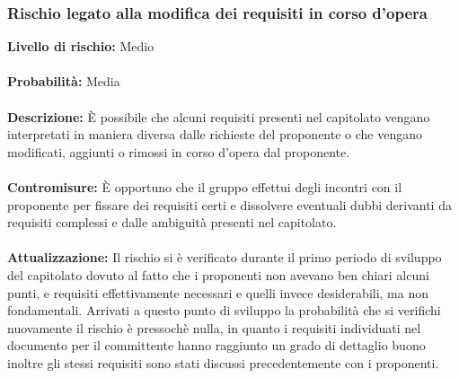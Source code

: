 	\subsubsection{Rischio legato alla modifica dei requisiti in corso d'opera}
	\label{AnalisiDeiRischi_Requisiti}
		\textbf{Livello di rischio:} Medio
		\\ \\
		\textbf{Probabilità:} Media
		\\ \\
		\textbf{Descrizione:} È possibile che alcuni requisiti presenti nel capitolato vengano interpretati in maniera diversa dalle richieste del proponente o che vengano modificati, aggiunti o rimossi in corso d'opera dal proponente.
		\\ \\		
		\textbf{Contromisure:} È opportuno che il gruppo effettui degli incontri con il proponente per fissare dei requisiti certi e dissolvere eventuali dubbi derivanti da requisiti complessi e dalle ambiguità presenti nel capitolato.
		\\ \\
		\textbf{Attualizzazione:} Il rischio si è verificato durante il primo periodo di sviluppo del capitolato dovuto al fatto che i proponenti non avevano ben chiari alcuni punti, e requisiti effettivamente necessari e quelli invece desiderabili, ma non fondamentali. Arrivati a questo punto di sviluppo la probabilità che si verifichi nuovamente il rischio è pressochè nulla, in quanto i requisiti individuati nel documento \analisi{} per il committente hanno raggiunto un grado di dettaglio buono inoltre gli stessi requisiti sono stati discussi precedentemente con i proponenti.
		
